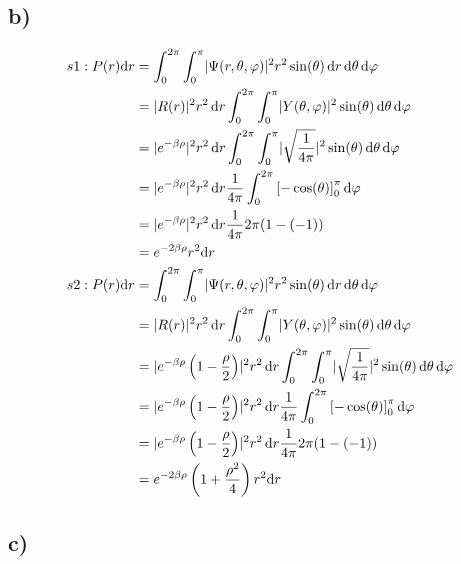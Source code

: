     \subsection{b)}

    \begin{align*}
        s1: P(r)\mathrm{d}r &= \int_{0}^{2\pi} \int_{0}^{\pi} \lvert\Psi(r,\theta,\varphi)\rvert^2 r^2 \sin(\theta)\, \mathrm{d}r\, \mathrm{d}\theta\, \mathrm{d}\varphi\\
        &= \lvert R(r)\rvert^2 r^2 \,\mathrm{d}r \int_{0}^{2\pi} \int_{0}^{\pi} \lvert Y(\theta,\varphi)\rvert^2 \sin(\theta) \, \mathrm{d}\theta\, \mathrm{d}\varphi\\
        &= \lvert e^{-\beta\rho}\rvert^2 r^2 \,\mathrm{d}r \int_{0}^{2\pi} \int_{0}^{\pi} \lvert\sqrt{\frac{1}{4\pi}}\rvert^2 \sin(\theta) \, \mathrm{d}\theta\, \mathrm{d}\varphi\\
        &= \lvert e^{-\beta\rho}\rvert^2 r^2 \,\mathrm{d}r \frac{1}{4\pi} \int_{0}^{2\pi} \left[-\cos(\theta)\right]_0^{\pi} \mathrm{d}\varphi\\
        &= \lvert e^{-\beta\rho}\rvert^2 r^2 \,\mathrm{d}r \frac{1}{4\pi} 2\pi (1-(-1))\\
        &= e^{-2\beta\rho} r^2 \mathrm{d}r\\
        s2: P(r)\mathrm{d}r &= \int_{0}^{2\pi} \int_{0}^{\pi} \lvert\Psi(r,\theta,\varphi)\rvert^2 r^2 \sin(\theta)\, \mathrm{d}r\, \mathrm{d}\theta\, \mathrm{d}\varphi\\
        &= \lvert R(r)\rvert^2 r^2 \,\mathrm{d}r \int_{0}^{2\pi} \int_{0}^{\pi} \lvert Y(\theta,\varphi)\rvert^2 \sin(\theta) \, \mathrm{d}\theta\, \mathrm{d}\varphi\\
        &= \lvert e^{-\beta\rho}\left( 1-\frac{\rho}{2} \right)\rvert^2 r^2 \,\mathrm{d}r \int_{0}^{2\pi} \int_{0}^{\pi} \lvert\sqrt{\frac{1}{4\pi}}\rvert^2 \sin(\theta) \, \mathrm{d}\theta\, \mathrm{d}\varphi\\
        &= \lvert e^{-\beta\rho}\left( 1-\frac{\rho}{2} \right)\rvert^2 r^2 \,\mathrm{d}r \frac{1}{4\pi} \int_{0}^{2\pi} \left[-\cos(\theta)\right]_0^{\pi} \mathrm{d}\varphi\\
        &= \lvert e^{-\beta\rho}\left( 1-\frac{\rho}{2} \right)\rvert^2 r^2 \,\mathrm{d}r \frac{1}{4\pi} 2\pi (1-(-1))\\
        &= e^{-2\beta\rho}\left( 1+\frac{\rho^2}{4} \right) r^2 \mathrm{d}r
    \end{align*}

    \subsection{c)}

